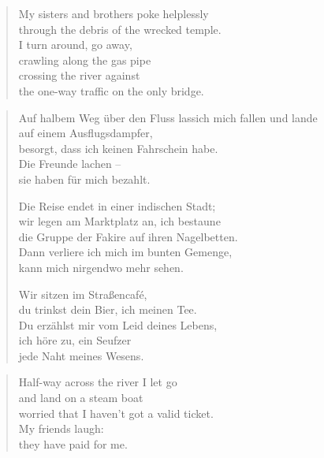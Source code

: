 {\begin{verse}
\rhytmbreak

My sisters and brothers poke helplessly\\
through the debris of the wrecked temple.\\
I turn around, go away,\\
crawling along the gas pipe\\
crossing the river against\\
the one-way traffic on the only bridge.

\end{verse}

\clearpage

\begin{verse}

Auf halbem Weg über den Fluss lass\verselinebreak ich mich fallen und lande\\
auf einem Ausflugsdampfer,\\
besorgt, dass ich keinen Fahrschein habe.\\
Die Freunde lachen --\\
sie haben für mich bezahlt.

\rhytmbreak

Die Reise endet in einer indischen Stadt;\\
wir legen am Marktplatz an, ich bestaune\\
die Gruppe der Fakire auf ihren Nagelbetten.\\
Dann verliere ich mich im bunten Gemenge,\\
kann mich nirgendwo mehr sehen.

\rhytmbreak

Wir sitzen im Straßencafé,\\
du trinkst dein Bier, ich meinen Tee.\\
Du erzählst mir vom Leid deines Lebens,\\
ich höre zu, ein Seufzer\\
jede Naht meines Wesens.

\rhytmbreak

\end{verse}

\clearpage

\begin{verse}
Half-way across the river I let go\\
and land on a steam boat\\
worried that I haven't got a valid ticket.\\
My friends laugh:\\
they have paid for me.


\end{verse}}
